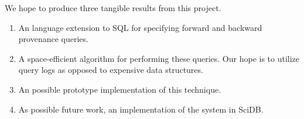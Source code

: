 \documentclass{article}
\begin{document}
We hope to produce three tangible results from this project. 

\begin{enumerate}
\item An language extension to SQL for specifying forward and backward provenance queries.
\item A space-efficient algorithm for performing these queries. Our hope is to utilize query logs as opposed to expensive data structures.
\item An possible prototype implementation of this technique.
\item As possible future work, an implementation of the system in SciDB.
\end{enumerate}




\end{document}
